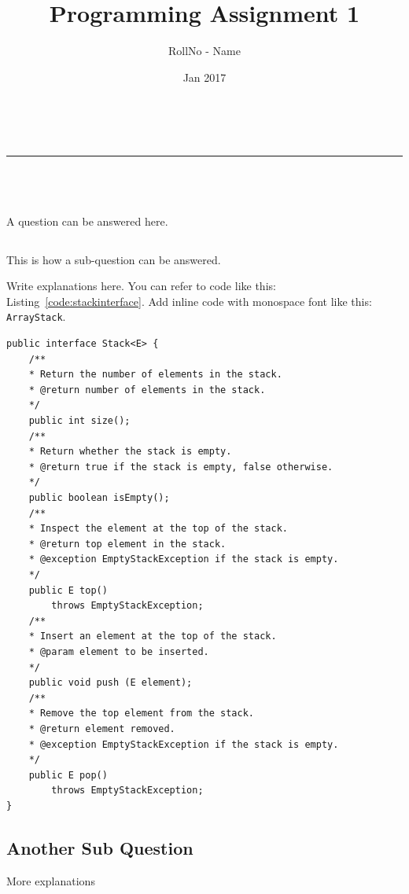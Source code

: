 \documentclass[a4paper,11pt]{article}
\makeatletter
\newcommand{\linia}{\rule{\linewidth}{0.5pt}}
\theoremstyle{mytheor}
\renewcommand{\maketitle}{
\begin{center}
\vspace{2ex}
{\huge \textsc{\@title}}
\vspace{1ex}
\\
\linia\\
\@author \hfill \@date
\vspace{4ex}
\end{center}
}
\makeatother
\begin{document}
\title{Programming Assignment \textnumero{} 1}

\author{RollNo - Name}

\date{Jan 2017}

\maketitle


\section{}

A question can be answered here.
\subsection{}

This is how a sub-question can be answered.

Write explanations here. You can refer to code like this: Listing~\ref{code:stackinterface}. Add inline code with monospace font like this: \texttt{ArrayStack}.



\begin{lstlisting}[label={code:stackinterface},caption=Stack interface in Java]
public interface Stack<E> {
    /**
    * Return the number of elements in the stack.
    * @return number of elements in the stack.
    */
    public int size();
    /**
    * Return whether the stack is empty.
    * @return true if the stack is empty, false otherwise.
    */
    public boolean isEmpty();
    /**
    * Inspect the element at the top of the stack.
    * @return top element in the stack.
    * @exception EmptyStackException if the stack is empty.
    */
    public E top()
        throws EmptyStackException;
    /**
    * Insert an element at the top of the stack.
    * @param element to be inserted.
    */
    public void push (E element);
    /**
    * Remove the top element from the stack.
    * @return element removed.
    * @exception EmptyStackException if the stack is empty.
    */
    public E pop()
        throws EmptyStackException;
}
\end{lstlisting}


\subsection{Another Sub Question}

More explanations

\section{}
\end{document}
